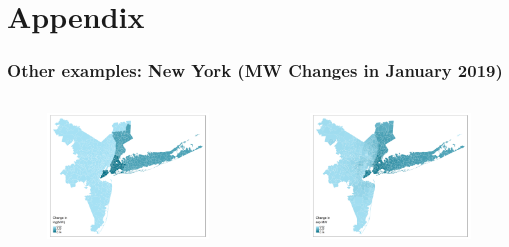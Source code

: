 \documentclass[aspectratio=169, t]{beamer}
\begin{document}
\section{Appendix}

\begin{frame}[label = nyc_example]
\frametitle{Other examples: New York (MW Changes in January 2019)}
    \begin{columns}
        \begin{column}{0.50\textwidth}
            \vspace{-4mm}
            \begin{figure}
                \centering
                \includegraphics[scale = 0.36]{maps_events/output/nyc_2018-12_actual_mw.png}
            \end{figure}   
        \end{column}
        \begin{column}{0.50\textwidth}
            \vspace{-4mm}
            \begin{figure}
                \centering
                \includegraphics[scale = 0.36]{maps_events/output/nyc2018-12_exp_mw.png}

\end{figure}
\end{column}
\end{columns}
\end{frame}
\end{document}
